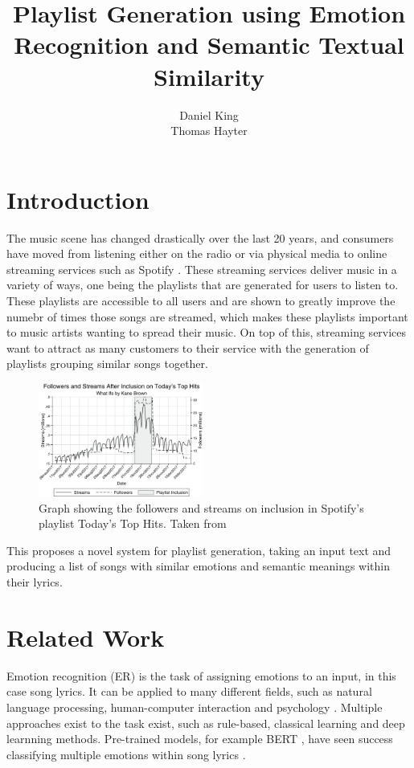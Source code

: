 \documentclass[11pt]{article}
\title{Playlist Generation using Emotion Recognition and Semantic Textual Similarity}
\author{
    Daniel King \\
    \And
    Thomas Hayter \\
}
\begin{document}
\maketitle


\section{Introduction}

The music scene has changed drastically over the last 20 years, and consumers have moved from listening either on the radio or via physical media to online streaming services such as Spotify \cite{streaming}. These streaming services deliver music in a variety of ways, one being the playlists that are generated for users to listen to. These playlists are accessible to all users and are shown to greatly improve the numebr of times those songs are streamed, which makes these playlists important to music artists wanting to spread their music. On top of this, streaming services want to attract as many customers to their service with the generation of playlists grouping similar songs together.

\begin{figure}[H]
    \centering
    \includegraphics[width=0.48\textwidth]{images/PlaylistStreams.jpg}
    \caption{Graph showing the followers and streams on inclusion in Spotify's playlist Today's Top Hits. Taken from \cite{playlists}}
\end{figure}

This proposes a novel system for playlist generation, taking an input text and producing a list of songs with similar emotions and semantic meanings within their lyrics. 

\section{Related Work}

Emotion recognition (ER) is the task of assigning emotions to an input, in this case song lyrics. It can be applied to many different fields, such as natural language processing, human-computer interaction and psychology \cite{emotionRecognition}. Multiple approaches exist to the task exist, such as rule-based, classical learning and deep learnning methods. Pre-trained models, for example BERT \cite{bert}, have seen success classifying multiple emotions within song lyrics \cite{edmonds-sedoc-2021-multi}.
\end{document}
